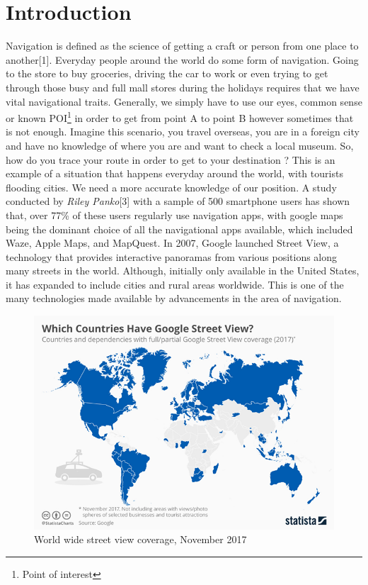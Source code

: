 \documentclass[conference]{IEEEtran}
\begin{document}
\section{Introduction}
Navigation is defined as the science of getting a craft or person from one place to another[1]. Everyday people around the world do some form of navigation. Going to the store to buy groceries, driving the car to work or even trying to get through those busy and full mall stores during the holidays requires that we have vital navigational traits. Generally, we simply have to use our eyes, common sense or known POI\footnote{Point of interest} in order to get from point A to point B however sometimes that is not enough. Imagine this scenario, you travel overseas, you are in a foreign city and have no knowledge of where you are and want to check a local museum. So, how do you trace your route in order to get to your destination ? This is an example of a situation that happens everyday around the world, with tourists flooding cities. We need a more accurate knowledge of our position. A study conducted by \textit{Riley Panko}[3] with a sample of 500 smartphone users has shown that, over 77\% of these users regularly use navigation apps, with google maps being the dominant choice of all the navigational apps available, which included Waze, Apple Maps, and MapQuest. In 2007, Google launched Street View, a technology that provides interactive panoramas from various positions along many streets in the world. Although, initially only available in the United States, it has expanded to include cities and rural areas worldwide. This is one of the many technologies made available by advancements in the area of navigation.

\begin{figure}
    \centering
    \includegraphics[width=\columnwidth]{countries-with-google-maps.png}
    \caption{World wide street view coverage, November 2017}
\end{figure}
\end{document}
